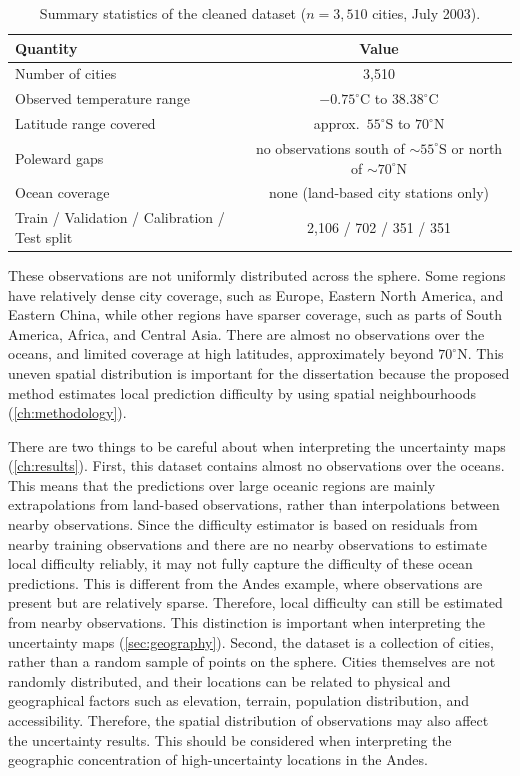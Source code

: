 \documentclass[11pt,a4paper]{report}
\begin{document}
\begin{table}[htbp]
\centering
\caption{Summary statistics of the cleaned dataset ($n=3{,}510$ cities, July 2003).}
\label{tab:data-summary}
\begin{tabular}{lc}
\toprule
Quantity & Value \\
\midrule
Number of cities & 3,510\\
Observed temperature range & $-0.75^\circ\mathrm{C}$ to $38.38^\circ\mathrm{C}$ \\
Latitude range covered & approx.\ $55^\circ\mathrm{S}$ to $70^\circ\mathrm{N}$ \\
Poleward gaps & no observations south of $\sim\!55^\circ\mathrm{S}$ or north of $\sim\!70^\circ\mathrm{N}$ \\
Ocean coverage & none (land-based city stations only) \\
Train / Validation / Calibration / Test split & 2,106 / 702 / 351 / 351\\
\bottomrule
\end{tabular}
\end{table}
These observations are not uniformly distributed across the sphere. Some regions have relatively dense city coverage, such as Europe, Eastern North America, and Eastern China, while other regions have sparser coverage, such as parts of South America, Africa, and Central Asia. There are almost no observations over the oceans, and limited coverage at high latitudes, approximately beyond $70^\circ\mathrm{N}$. This uneven spatial distribution is important for the dissertation because the proposed method estimates local prediction difficulty by using spatial neighbourhoods (\cref{ch:methodology}). 
 
There are two things to be careful about when interpreting the uncertainty maps (\cref{ch:results}). First, this dataset contains almost no observations over the oceans. This means that the predictions over large oceanic regions are mainly extrapolations from land-based observations, rather than interpolations between nearby observations. Since the difficulty estimator is based on residuals from nearby training observations and there are no nearby observations to estimate local difficulty reliably, it may not fully capture the difficulty of these ocean predictions. This is different from the Andes example, where observations are present but are relatively sparse. Therefore, local difficulty can still be estimated from nearby observations. This distinction is important when interpreting the uncertainty maps (\cref{sec:geography}). Second, the dataset is a collection of cities, rather than a random sample of points on the sphere. Cities themselves are not randomly distributed, and their locations can be related to physical and geographical factors such as elevation, terrain, population distribution, and accessibility. Therefore, the spatial distribution of observations may also affect the uncertainty results. This should be considered when interpreting the geographic concentration of high-uncertainty locations in the Andes.
 
\end{document}
